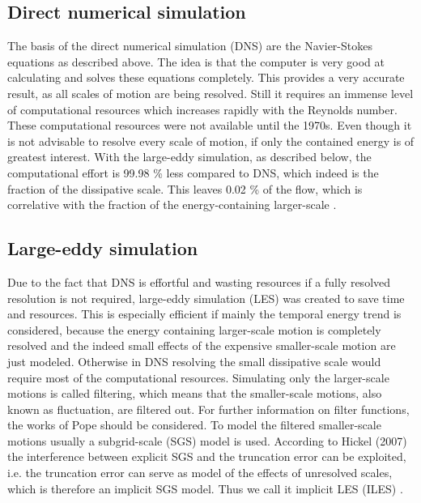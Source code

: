 \documentclass[11pt,a4paper,openany,oneside,parskip=half*]{article}
\begin{document}
\subsection{Direct numerical simulation}
The basis of the direct numerical simulation (DNS) are the Navier-Stokes equations as described above. The idea is that the computer is very good at calculating and solves these equations completely. This provides a very accurate result, as all scales of motion are being resolved. Still it requires an immense level of computational resources which increases rapidly with the Reynolds number. These computational resources were not available until the 1970s. Even though it is not advisable to resolve every scale of motion, if only the contained energy is of greatest interest. With the large-eddy simulation, as described below, the computational effort is 99.98 \% less compared to DNS, which indeed is the fraction of the dissipative scale. This leaves 0.02 \% of the flow, which is correlative with the fraction of the energy-containing larger-scale \cite{turbulentFlows}.%
\subsection{Large-eddy simulation}
Due to the fact that DNS is effortful and wasting resources if a fully resolved resolution is not required, large-eddy simulation (LES) was created to save time and resources. This is especially efficient if mainly the temporal energy trend is considered, because the energy containing larger-scale motion is completely resolved and the indeed small effects of the expensive smaller-scale motion are just modeled. Otherwise in DNS resolving the small dissipative scale would require most of the computational resources.
\newline
Simulating only the larger-scale motions is called filtering, which means that the smaller-scale motions, also known as fluctuation, are filtered out. For further information on filter functions, the works of Pope \cite{turbulentFlows} should be considered. To model the filtered smaller-scale motions usually a subgrid-scale (SGS) model is used. According to Hickel (2007) the interference between explicit SGS and the truncation error can be exploited, i.e. the truncation error can serve as model of the effects of unresolved scales, which is therefore an implicit SGS model. Thus we call it implicit LES (ILES) \cite{implicitLES}. %
\end{document}

